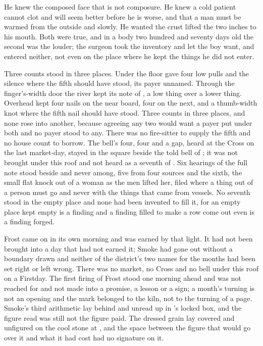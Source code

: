 He knew the composed face that is not composure. He knew a cold patient cannot clot and will seem better before he is worse, and that a man must be warmed from the outside and slowly. He wanted the crust lifted the two inches to his mouth. Both were true, and in a body two hundred and seventy days old the second was the louder; the surgeon took the inventory and let the boy want, and entered neither, not even on the place where he kept the things he did not enter.

\scenebreak

Three counts stood in three places. Under the floor  gave four low pulls and the silence where the fifth should have stood, its payer unnamed. Through the finger's-width door the river kept its note of , a low thing over a lower thing. Overhead  kept four nails on the near board, four on the next, and a thumb-width knot where the fifth nail should have stood. Three counts in three places, and none rose into another, because agreeing any two would want a payer put under both and no payer stood to any. There was no fire-sitter to supply the fifth and no house count to borrow. The bell's four, four and a gap, heard at the Cross on the last market-day, stayed in the square beside the told bell of ; it was not brought under this roof and not heard as a seventh of . Six hearings of the full note stood beside and never among, five from four sources and the sixth, the small flat knock out of a woman as the men lifted her, filed where a thing out of a person must go and never with the things that came from vessels. No seventh stood in the empty place and none had been invented to fill it, for an empty place kept empty is a finding and a finding filled to make a row come out even is a finding forged.

Frost came on in its own morning and was earned by that light. It had not been brought into a day that had not earned it; Smoke had gone out without a boundary drawn and neither of the district's two names for the months had been set right or left wrong. There was no market, no Cross and no bell under this roof on a Firstday. The first firing of Frost stood one morning ahead and was not reached for and not made into a promise, a lesson or a sign; a month's turning is not an opening and the mark belonged to the kiln, not to the turning of a page. Smoke's third arithmetic lay behind and unread up  in 's locked box, and the figure read was still not the figure paid. The dressed grain lay covered and unfigured on the cool stone at , and the space between the figure that would go over it and what it had cost had no signature on it.

